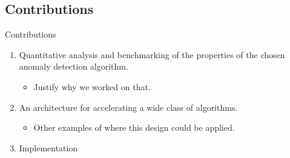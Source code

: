 \subsection{Contributions}
\begin{frame}[label=contributions]{Contributions}
    \begin{enumerate}
        \item Quantitative analysis and benchmarking of the properties of the
            chosen anomaly detection algorithm.
        \begin{itemize}
            \item Justify why we worked on that.
        \end{itemize}
        \item An architecture for accelerating a wide class of algorithms.
        \begin{itemize}
            \item Other examples of where this design could be applied.
        \end{itemize}
        \item Implementation
    \end{enumerate}
\end{frame}